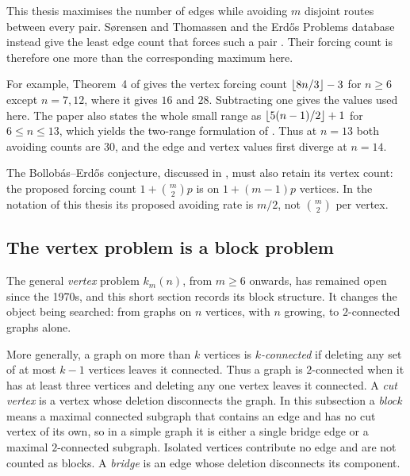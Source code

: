 \begin{remark}\label{rem:threshold-convention}\label{rem:threshold-audit}
This thesis maximises the number of edges while avoiding $m$ disjoint routes
between every pair. S{\o}rensen and Thomassen and the Erd\H{o}s Problems
database instead give the least edge count that forces such a pair
\cite{SorensenThomassen74,ErdosProblems}. Their forcing count is therefore
one more than the corresponding maximum here.

For example, Theorem~4 of \cite{SorensenThomassen74} gives the vertex forcing
count $\left\lfloor 8n/3 \right\rfloor-3$ for $n\ge6$ except $n=7,12$, where it gives $16$ and
$28$. Subtracting one gives the values used here. The paper also states the
whole small range as $\left\lfloor 5(n-1)/2 \right\rfloor+1$ for $6\le n\le13$, which yields
the two-range formulation of . Thus at $n=13$
both avoiding counts are $30$, and the edge and vertex values first diverge
at $n=14$.

The Bollob\'{a}s--Erd\H{o}s conjecture, discussed in , must also retain its vertex count:
the proposed forcing count $1+\binom m2 p$ is on $1+(m-1)p$ vertices.
In the notation of this thesis its proposed avoiding rate is $m/2$, not
$\binom m2$ per vertex.
\end{remark}

\subsection{The vertex problem is a block problem}\label{sec:simple-vertex-blocks}

The general \emph{vertex} problem $k_m(n)$, from $m \ge 6$ onwards, has remained open since the 1970s, and this short section records its block structure. It changes the object being searched: from graphs on $n$ vertices, with $n$ growing, to $2$-connected graphs alone.

More generally, a graph on more than $k$ vertices is \emph{$k$-connected} if
deleting any set of at most $k-1$ vertices leaves it connected. Thus a graph is
$2$-connected when it has at least three vertices and deleting any one vertex
leaves it connected. A \emph{cut vertex} is a vertex whose deletion disconnects
the graph. In this subsection a \emph{block} means a maximal connected subgraph
that contains an edge and has no cut vertex of its own, so in a simple graph it
is either a single bridge edge or a maximal $2$-connected subgraph. Isolated
vertices contribute no edge and are not counted as blocks. A \emph{bridge} is
an edge whose deletion disconnects its component.

